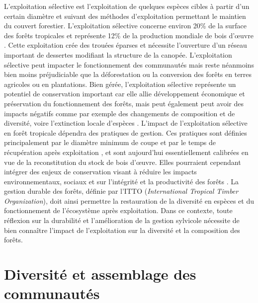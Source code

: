 \documentclass[
  11pt,
  french,
  A4paper,
  extrafontsizes,onecolumn,openright
  ]{memoir}
\begin{document}
L'exploitation sélective est l'exploitation de quelques espèces cibles à
partir d'un certain diamètre et suivant des méthodes d'exploitation
permettant le maintien du couvert forestier. L'exploitation sélective
concerne environ 20\% de la surface des forêts tropicales et représente
12\% de la production mondiale de bois d'œuvre \autocite{Martin2015}.
Cette exploitation crée des trouées éparses et nécessite l'ouverture
d'un réseau important de dessertes modifiant la structure de la canopée.
L'exploitation sélective peut impacter le fonctionnement des communautés
mais reste néanmoins bien moins préjudiciable que la déforestation ou la
conversion des forêts en terres agricoles ou en plantations. Bien gérée,
l'exploitation sélective représente un potentiel de conservation
important car elle allie développement économique et préservation du
fonctionnement des forêts, mais peut également peut avoir des impacts
négatifs comme par exemple des changements de composition et de
diversité, voire l'extinction locale d'espèces \autocite{Gibson2011}.
L'impact de l'exploitation sélective en forêt tropicale dépendra des
pratiques de gestion. Ces pratiques sont définies principalement par le
diamètre minimum de coupe et par le temps de récupération après
exploitation \autocite{Sist2015}, et sont aujourd'hui essentiellement
calibrées en vue de la reconstitution du stock de bois d'œuvre. Elles
pourraient cependant intégrer des enjeux de conservation visant à
réduire les impacts environnementaux, sociaux et sur l'intégrité et la
productivité des forêts \autocite{ITTO2005}. La gestion durable des
forêts, définie par l'ITTO (\emph{International Tropical Timber
Organization}), doit ainsi permettre la restauration de la diversité en
espèces et du fonctionnement de l'écosystème après exploitation. Dans ce
contexte, toute réflexion sur la durabilité et l'amélioration de la
gestion sylvicole nécessite de bien connaître l'impact de l'exploitation
sur la diversité et la composition des forêts.

\section{Diversité et assemblage des
communautés}\label{diversite-et-assemblage-des-communautes}
\end{document}
